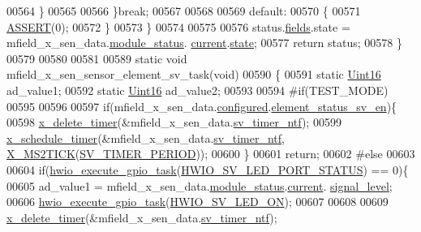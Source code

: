 \begin{DoxyCode}
00564              \}
00565 
00566         \}\textcolor{keywordflow}{break};
00567 
00568 
00569         \textcolor{keywordflow}{default}:
00570         \{
00571             \hyperlink{a00072_abb8ff8e213ac9f6fb21d2b968583b936}{ASSERT}(0);
00572         \}
00573     \}
00574 
00575 
00576     status.\hyperlink{a00021_a5296d090c085b0421fdf5a86e382abea}{fields}.state = mfield\_x\_sen\_data.\hyperlink{a00025_adfab5a5d8b45a93dfb13edb24e2b80e3}{module\_status}.
      \hyperlink{a00019_acf41ffc11da291c2f9f0fcb02ee72b98}{current}.\hyperlink{a00019_a6b8d8e916bc56265a3fd279bd26b6d1b}{state};
00577     \textcolor{keywordflow}{return} status;
00578 \}
00579 
00580 
00581 
00589 \textcolor{keyword}{static} \textcolor{keywordtype}{void} mfield\_x\_sen\_sensor\_element\_sv\_task(\textcolor{keywordtype}{void})
00590 \{
00591     \textcolor{keyword}{static} \hyperlink{a00072_a59a9f6be4562c327cbfb4f7e8e18f08b}{Uint16} ad\_value1;
00592     \textcolor{keyword}{static} \hyperlink{a00072_a59a9f6be4562c327cbfb4f7e8e18f08b}{Uint16} ad\_value2;
00593 
00594 \textcolor{preprocessor}{#if(TEST\_MODE)}
00595 
00596 
00597     \textcolor{keywordflow}{if}(mfield\_x\_sen\_data.\hyperlink{a00025_a94b2d1f6ea4ab334c74d24984dd27843}{configured}.\hyperlink{a00021_afeb3f74725269028a60926f98890c22b}{element\_status\_sv\_en})\{
00598     \hyperlink{a00036_ab69e9af4cfa717e870d587906283635c}{x\_delete\_timer}(&mfield\_x\_sen\_data.\hyperlink{a00025_ada91b200053f2d93e3639dc4ee3415b4}{sv\_timer\_ntf});
00599     \hyperlink{a00036_a9e3befaa21e83f196f74201deed85346}{x\_schedule\_timer}(&mfield\_x\_sen\_data.\hyperlink{a00025_ada91b200053f2d93e3639dc4ee3415b4}{sv\_timer\_ntf},
      \hyperlink{a00036_a1732cd929c486b3a225824bb2b3dba36}{X\_MS2TICK}(\hyperlink{a00023_a8a535456285f4602701c814d7b69cc68}{SV\_TIMER\_PERIOD}));
00600     \}
00601     \textcolor{keywordflow}{return};
00602 \textcolor{preprocessor}{#else}
00603 
00604     \textcolor{keywordflow}{if}(\hyperlink{a00058_a0af9eae455fbdf4e77def5bfffa109cb}{hwio\_execute\_gpio\_task}(\hyperlink{a00058_ab1278d6ffe9c661f55b9f146f82b0be6}{HWIO\_SV\_LED\_PORT\_STATUS}) == 0)\{
00605     ad\_value1  = mfield\_x\_sen\_data.\hyperlink{a00025_adfab5a5d8b45a93dfb13edb24e2b80e3}{module\_status}.\hyperlink{a00019_acf41ffc11da291c2f9f0fcb02ee72b98}{current}.
      \hyperlink{a00019_a4070db8eab0ff93e3fbc1df59872f117}{signal\_level};
00606     \hyperlink{a00058_a0af9eae455fbdf4e77def5bfffa109cb}{hwio\_execute\_gpio\_task}(\hyperlink{a00058_aae186cdf37c0783bf64b0aed3f1e6eda}{HWIO\_SV\_LED\_ON});
00607 
00608 
00609     \hyperlink{a00036_ab69e9af4cfa717e870d587906283635c}{x\_delete\_timer}(&mfield\_x\_sen\_data.\hyperlink{a00025_ada91b200053f2d93e3639dc4ee3415b4}{sv\_timer\_ntf});

\end{DoxyCode}
